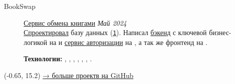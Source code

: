 \documentclass[margin,line]{resume}
\begin{document}
\begin{resume}
  \begin{description}

    \item[BookSwap]\small{\href{https://github.com/alchemmist/bookswap}{Сервис
        обмена книгами} \hfill
      \textsl{Май 2024\vspace{1mm}}}\\
      \href{https://github.com/alchemmist/bookswap/blob/dev/docs/database.md}{Спроектировал}
      базу данных
      (\href{https://github.com/alchemmist/bookswap/blob/dev/backend/src/main/resources/schema.sql}{\texttt{1}}).
      Написал
      \href{https://github.com/alchemmist/bookswap/tree/dev/backend}{бэкенд}
      с ключевой бизнес-логикой на  и
      \href{https://github.com/alchemmist/bookswap/tree/dev/auth-service}{сервис
      авторизации} на , а так же фронтенд на
      .

      \textbf{Технологии:} ,
      , 
      , , ,
      , .

  \end{description}
\end{resume}

\begin{minipage}[H]{9.18\textwidth}
  \begin{textblock}{7}(-0.65, 15.2)
    \begingroup
    \hspace{35mm}
    \hypersetup{urlcolor=gray!90}
    \large
    \href{https://github.com/alchemmist}{→ больше проектв на GitHub}
    \endgroup
  \end{textblock}
\end{minipage}
\end{document}
